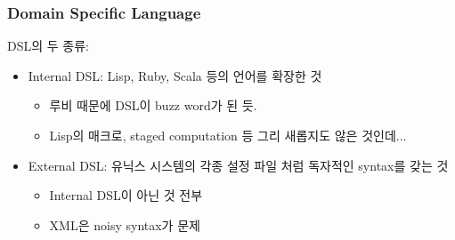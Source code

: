 \begin{frame}
\frametitle{Domain Specific Language}

DSL의 두 종류:
\begin{itemize}
\item Internal DSL: Lisp, Ruby, Scala  등의 언어를 확장한 것
    \begin{itemize}
    \item 루비 때문에 DSL이 buzz word가 된 듯.
    \item Lisp의 매크로, staged computation 등 그리 새롭지도 않은 것인데...
    \end{itemize}
\item External DSL: 유닉스 시스템의 각종 설정 파일 처럼 독자적인  syntax를 갖는 것
    \begin{itemize}
    \item Internal DSL이 아닌 것 전부
    \item XML은 noisy syntax가 문제
    \end{itemize}
\end{itemize}


\end{frame}
